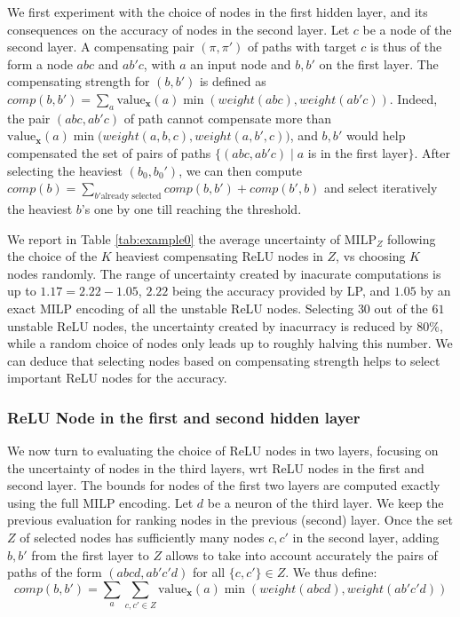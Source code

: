 \documentclass{llncs}
\newcommand{\vx}{\boldsymbol{x}}
\newcommand{\val}{{\textrm{value}}}
\newcommand{\MILP}{{\textrm{MILP}}}
\begin{document}
We first experiment with the choice of nodes in the first hidden layer, and its consequences on the accuracy of nodes in the second layer.  Let $c$ be a node of the second layer.
A compensating pair $(\pi,\pi')$ of paths with target $c$ is thus of the form a node $a b c$ and $a b' c$, with $a$ an input node and $b,b'$ on the first layer. The compensating strength for $(b,b')$ is defined as $comp(b,b')=\sum_a \val_{\vx}(a) \min(weight(abc),weight(ab'c))$. Indeed, the pair $(a b c,a b' c)$ of path cannot compensate more than $\val_{\vx}(a) \min(weight(a,b,c),$\newline $weight(a,b',c))$, and $b,b'$ would help compensated the set of pairs of paths $\{(a b c,a b' c) \mid a$ is in the first layer$\}$. After selecting the heaviest $(b_0,b_0')$, we can then compute $comp(b)= \sum_{b' \text{already selected}} comp(b,b')+comp(b',b)$ and select iteratively the heaviest $b$'s one by one till reaching the threshold. 

We report in Table \ref{tab:example0} the average uncertainty of $\MILP_Z$ following the choice of the $K$ heaviest compensating ReLU nodes in $Z$, vs choosing $K$ nodes randomly. The range of uncertainty created by inacurate computations is up to $1.17=2.22-1.05$, $2.22$ being the accuracy provided by LP, and $1.05$ by an exact MILP encoding of all the unstable ReLU nodes. Selecting $30$ out of the $61$ unstable ReLU nodes, the uncertainty created by inacurracy is reduced by $80\%$, while a random choice of nodes only leads up to roughly halving this number. We can deduce that selecting nodes based on compensating strength helps to select important ReLU nodes for the accuracy.



\newpage 

\subsubsection*{ReLU Node in the first and second hidden layer}

We now turn to evaluating the choice of ReLU nodes in two layers, focusing on the uncertainty of nodes in the third layers, wrt ReLU nodes in the first and second layer.
The bounds for nodes of the first two layers are computed exactly using the full MILP encoding. Let $d$ be a neuron of the third layer.
We keep the previous evaluation for ranking nodes in the previous (second) layer. 
Once the set $Z$ of selected nodes has sufficiently many nodes $c,c'$ in the second layer, adding $b,b'$ from the first layer to $Z$ allows to take into account accurately the pairs of paths of the form $(a b c d, a b' c' d)$ for all $\{c,c'\} \in Z$. We thus define:
\vspace{-0.2cm}
$$comp(b,b')=\sum_a \sum_{c,c' \in Z} \val_{\vx}(a) \min( weight(abcd),weight(ab'c'd))$$ 
\vspace{-0.2cm}
\end{document}
